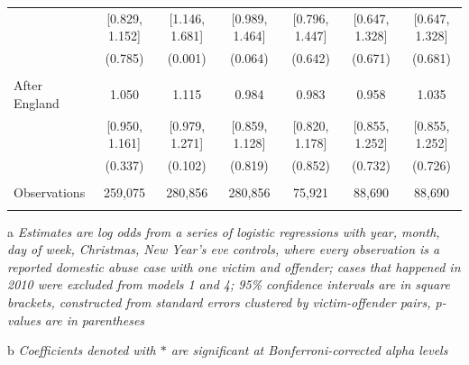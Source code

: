 \documentclass[12pt, a4paper]{article}
\begin{document}
\begin{table}
{\begin{threeparttable}
\begin{tabular}{@{\extracolsep{5pt}}lcccccc}
  & [0.829, 1.152] & [1.146, 1.681] & [0.989, 1.464] & [0.796, 1.447] & [0.647, 1.328] & [0.647, 1.328] \\
  & (0.785) & (0.001) & (0.064) & (0.642) & (0.671) & (0.681) \\
  & & & & & & \\
 After England & 1.050 & 1.115 & 0.984 & 0.983 & 0.958 & 1.035 \\
  & [0.950, 1.161] & [0.979, 1.271] & [0.859, 1.128] & [0.820, 1.178] & [0.855, 1.252] & [0.855, 1.252] \\
  & (0.337) & (0.102) & (0.819) & (0.852) & (0.732) & (0.726) \\


\hline \\[-1.8ex]
Observations & 259,075 & 280,856 & 280,856 & 75,921 & 88,690 & 88,690 \\
\hline
\hline \\[-1.8ex]
\end{tabular}
\begin{tablenotes}
      \item[a] \textit{Estimates are log odds from a series of logistic regressions with year, month, day of week, Christmas, New Year's eve controls, where every observation is a reported domestic abuse case with one victim and offender; cases that happened in 2010 were excluded from models 1 and 4; 95\% confidence intervals are in square brackets, constructed from standard errors clustered by victim-offender pairs, p-values are in parentheses}
                         \item[b] \textit{Coefficients denoted with $*$ are significant at Bonferroni-corrected alpha levels}
    \end{tablenotes}
\end{threeparttable}   }
\end{table}
\end{document}
